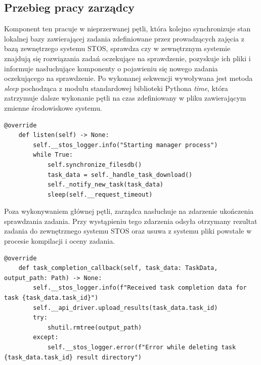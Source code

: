 \subsection{Przebieg pracy zarządcy}
Komponent ten pracuje w nieprzerwanej pętli, która kolejno synchronizuje stan lokalnej bazy zawierającej zadania zdefiniowane przez prowadzących zajęcia z bazą zewnętrzego systemu STOS, sprawdza czy w zewnętrznym systemie znajdują się rozwiązania zadań oczekujące na sprawdzenie, pozyskuje ich pliki i informuje nasłuchujące komponenty o pojawieniu się nowego zadania oczekującego na sprawdzenie. Po wykonanej sekwencji wywoływana jest metoda \textit{sleep} pochodząca z modułu standardowej biblioteki Pythona \textit{time}\cite{pythonTime}, która zatrzymuje dalsze wykonanie pętli na czas zdefiniowany w pliku zawierającym zmienne środowiskowe systemu.
\lstset{style=python}
\begin{lstlisting}[caption = {Implementacja metody listen.}]
    @override
    def listen(self) -> None:
        self.__stos_logger.info("Starting manager process")
        while True:
            self.synchronize_filesdb()
            task_data = self._handle_task_download()
            self._notify_new_task(task_data)
            sleep(self.__request_timeout)
\end{lstlisting}
Poza wykonywaniem głównej pętli, zarządca nasłuchuje na zdarzenie ukończenia sprawdzania zadania. Przy wystąpieniu tego zdarzenia odsyła otrzymany rezultat zadania do zewnętrznego systemu STOS oraz usuwa z systemu pliki powstałe w procesie kompilacji i oceny zadania.
\lstset{style=python}
\begin{lstlisting}[caption = {Implementacja metody wywoływanej przy zdarzeniu ukończenia sprawdzania zadania.}]
    @override
    def task_completion_callback(self, task_data: TaskData, output_path: Path) -> None:
        self.__stos_logger.info(f"Received task completion data for task {task_data.task_id}")
        self.__api_driver.upload_results(task_data.task_id)
        try:
            shutil.rmtree(output_path)
        except:
            self.__stos_logger.error(f"Error while deleting task {task_data.task_id} result directory")
\end{lstlisting}
